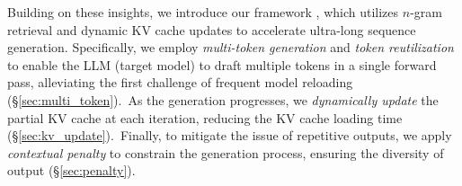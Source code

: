 Building on these insights,  we introduce our framework \ours, which utilizes $n$-gram retrieval and dynamic KV cache updates to accelerate ultra-long sequence generation.
Specifically, we employ \textit{multi-token generation} and \textit{token reutilization} to enable the LLM (\ie target model) to draft multiple tokens in a single forward pass, alleviating the first challenge of frequent model reloading (\S \ref{sec:multi_token}).\,
As the generation progresses, we \textit{dynamically update} the partial KV cache at each iteration, reducing the KV cache loading time (\S \ref{sec:kv_update}).\,
Finally, to mitigate the issue of repetitive outputs, we apply \textit{contextual penalty} to constrain the generation process, ensuring the diversity of output (\S \ref{sec:penalty}).

